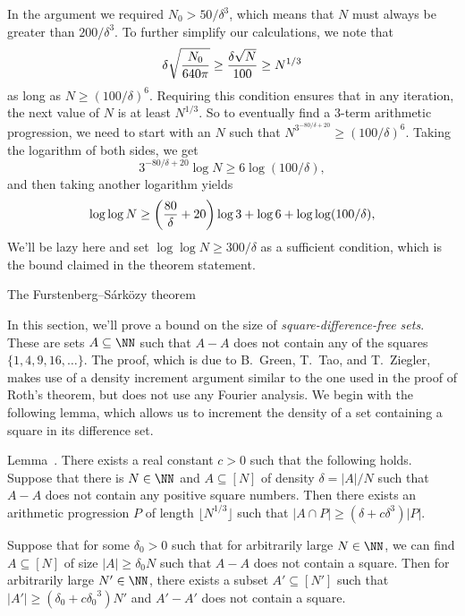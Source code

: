 In the argument we required $N_0 > 50/\delta^3$, which means that $N$ must always be greater than
$200/\delta^3$. To further simplify our calculations, we note that
$$\delta \sqrt{N_0\over 640\pi } \ge {\delta\sqrt N\over 100} \ge N^{1/3}$$
as long as $N\ge (100/\delta)^6$. Requiring this condition ensures that in any iteration, the next
value of $N$ is at least $N^{1/3}$. So to eventually find a $3$-term arithmetic
progression, we need to start with an $N$ such that $N^{3^{-80/\delta+20}} \ge (100/\delta)^6$.
Taking the logarithm of both sides, we get
$$ 3^{-80/\delta+20} \log N \ge 6\log(100/\delta),$$
and then taking another logarithm yields
$$ \log\log N \ge \biggl({80\over\delta} + 20\biggr)\log 3 +\log 6 + \log\log(100/\delta),$$
We'll be lazy here and set $\log\log N\ge 300/\delta$ as
a sufficient condition, which is the bound claimed in the theorem statement.\slug

\advsect The Furstenberg--S\'ark\"ozy theorem

In this section, we'll prove a bound on the size of {\it square-difference-free sets}. These are sets
$A\subseteq \NN$ such that $A-A$ does not contain any of the squares $\{1,4,9,16,\ldots\}$.
The proof, which is due to B.~Green, T.~Tao, and T.~Ziegler,
makes use of a density increment argument similar to the one used in the proof of
Roth's theorem, but does not use any Fourier analysis. We begin with the following lemma, which allows
us to increment the density of a set containing a square in its difference set.

\proclaim Lemma~\advthm. There exists a real constant $c>0$ such that the following holds.
Suppose that there is $N\in \NN$ and $A\subseteq [N]$ of density $\delta = |A|/N$ such that
$A-A$ does not contain any positive square numbers. Then there exists an arithmetic progression
$P$ of length $\lfloor N^{1/3}\rfloor$ such that $|A\cap P| \ge (\delta + c\delta^3)|P|$.

Suppose that for
some $\delta_0>0$ such that for arbitrarily large $N\in \NN$, we can find $A\subseteq [N]$
of size $|A|\ge \delta_0 N$ such that $A-A$ does not contain a square. Then for
arbitrarily large $N'\in \NN$, there exists a subset
$A'\subseteq [N']$ such that $|A'|\ge (\delta_0 + c{\delta_0}^3)N'$ and $A'-A'$ does not contain a square.

